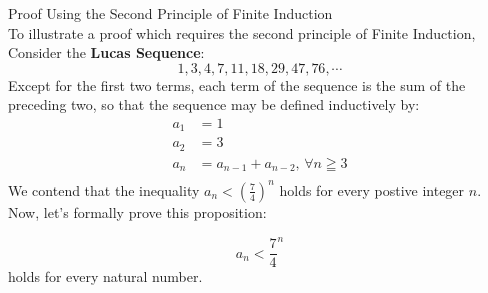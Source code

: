 \newpage
\begin{example}
Proof Using the Second Principle of Finite Induction \\

To illustrate a proof which requires the second principle of Finite Induction, Consider the \textbf{Lucas Sequence}:
    \begin{equation*}
        1, 3, 4, 7, 11, 18, 29, 47, 76, \cdots
    \end{equation*}
Except for the first two terms, each term of the sequence is the sum of the preceding two, so that the sequence may be defined inductively by:
    \begin{align*}
        a_1 & = 1 \\
        a_2 & = 3 \\
        a_n & = a_{n-1} + a_{n-2} \text{, }\forall n \geqq 3 \\
    \end{align*}
We contend that the inequality $a_n < (\frac{7}{4})^n$ holds for every postive integer $n$. Now, let's formally prove this proposition: 

\begin{tcolorbox}
    \begin{theorem}
        \begin{equation*}
            a_n < {\frac{7}{4}}^n
        \end{equation*}
        holds for every natural number. 
    \end{theorem}
\end{tcolorbox}


\end{example}

